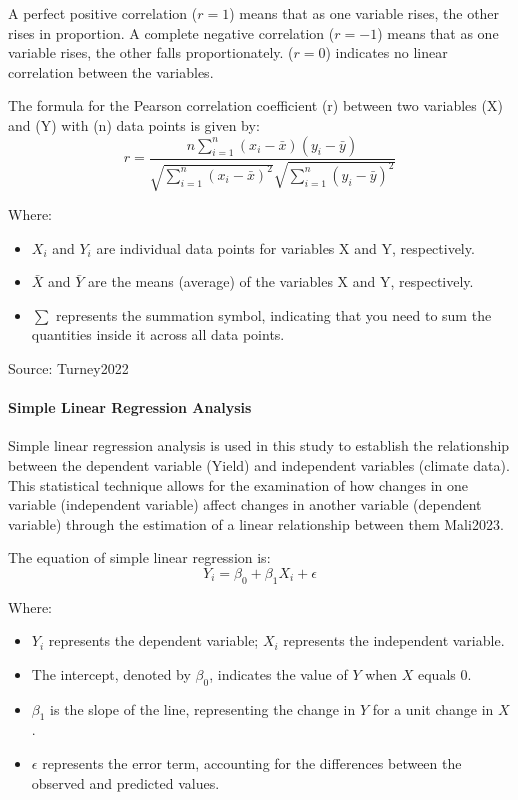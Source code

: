 A perfect positive correlation ($r = 1$) means that as one variable rises, the other rises in proportion.
A complete negative correlation ($r = -1$) means that as one variable rises, the other falls proportionately.
($r = 0$) indicates no linear correlation between the variables.

The formula for the Pearson correlation coefficient (r) between two variables (X) and (Y) with (n) data points is given by:
\[
r = \frac{n \sum_{i=1}^{n} (x_i - \bar{x})(y_i - \bar{y})}{\sqrt{\sum_{i=1}^{n} (x_i - \bar{x})^2} \sqrt{\sum_{i=1}^{n} (y_i - \bar{y})^2}}
\]

Where:
\begin{itemize}
    \item $X_i$ and $Y_i$ are individual data points for variables X and Y, respectively.
    \item $\bar{X}$ and $\bar{Y}$ are the means (average) of the variables X and Y, respectively.
    \item $\sum$ represents the summation symbol, indicating that you need to sum the quantities inside it across all data points.
\end{itemize}

Source: Turney2022

\paragraph{Simple Linear Regression Analysis}
Simple linear regression analysis is used in this study to establish the relationship between the dependent variable (Yield) and independent variables (climate data). This statistical technique allows for the examination of how changes in one variable (independent variable) affect changes in another variable (dependent variable) through the estimation of a linear relationship between them Mali2023.

The equation of simple linear regression is:
\[
Y_i = \beta_0 + \beta_1 X_i + \epsilon
\]

Where:
\begin{itemize}
    \item $Y_i$ represents the dependent variable; $X_i$ represents the independent variable.
    \item The intercept, denoted by $\beta_0$, indicates the value of $Y$ when $X$ equals 0.
    \item $\beta_1$ is the slope of the line, representing the change in $Y$ for a unit change in $X$.
    \item $\epsilon$ represents the error term, accounting for the differences between the observed and predicted values.
\end{itemize}

